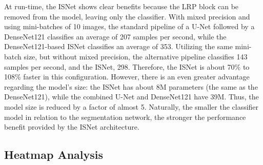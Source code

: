\documentclass[fleqn,10pt]{wlscirep}
\begin{document}
{At run-time, the ISNet shows clear benefits because the LRP block can be removed from the model, leaving only the classifier. With mixed precision and using mini-batches of 10 images, the standard pipeline of a U-Net followed by a DenseNet121 classifies an average of 207 samples per second, while the DenseNet121-based ISNet classifies an average of 353. Utilizing the same mini-batch size, but without mixed precision, the alternative pipeline classifies 143 samples per second, and the ISNet, 298. Therefore, the ISNet is about 70\% to 108\% faster in this configuration. However, there is an even greater advantage regarding the model's size: the ISNet has about 8M parameters (the same as the DenseNet121), while the combined U-Net and DenseNet121 have 39M. Thus, the model size is reduced by a factor of almost 5. Naturally, the smaller the classifier model in relation to the segmentation network, the stronger the performance benefit provided by the ISNet architecture.

\subsection{Heatmap Analysis}
\label{heatmapAnalysis}

}
\end{document}
